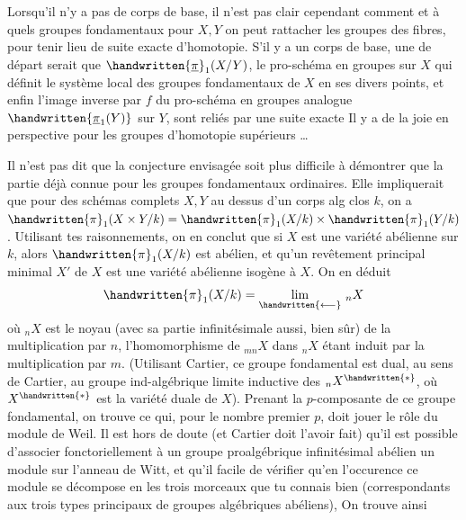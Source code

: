 
Lorsqu'il n'y a pas de corps de base, il n'est pas clair cependant
comment et à quels groupes fondamentaux  pour $X,Y$ on peut
rattacher  les groupes  des fibres,
pour tenir lieu de suite exacte d'homotopie. S'il y a un corps de
base, une   de départ serait que  $\handwritten{\underline\pi}_1(X/Y)$, le pro-schéma en groupes  sur $X$ qui définit le système
local des groupes fondamentaux  de $X$ en ses divers points,
et enfin l'image inverse par $f$ du pro-schéma en groupes analogue $\handwritten{\underline{\pi}_1(Y)}$
sur $Y$, sont reliés par une suite exacte   Il y a de
la joie en perspective pour les groupes d'homotopie supérieurs \ldots

Il n'est pas dit que la conjecture envisagée soit plus difficile
à démontrer que la partie déjà connue pour les groupes fondamentaux
ordinaires. Elle impliquerait que pour des schémas complets $X,Y$ au
dessus d'un corps alg clos $k$, on a $\handwritten{\pi}_1(X\times Y/k)=\handwritten{\pi}_1(X/k)\times\handwritten{\pi}_1(Y/k)$.
Utilisant tes raisonnements, on en conclut que si $X$ est une
variété abélienne sur $k$, alors $\handwritten{\pi}_1(X/k)$ est abélien, et qu'un
revêtement principal minimal $X'$ de $X$ est une variété abélienne isogène à $X$. On en déduit
\[
\handwritten{\pi}_1(X/k)=\underset{\handwritten{\longleftarrow}}{\lim}\ {}_nX
\]
où ${}_nX$ est le noyau (avec sa partie infinitésimale aussi, bien sûr)
de la multiplication par $n$, l'homomorphisme de ${}_{mn}X$ dans ${}_nX$ étant
induit par la multiplication par $m$. (Utilisant Cartier, ce groupe
fondamental est dual, au sens de Cartier, au groupe ind-algébrique
limite inductive des ${}_nX^{\handwritten{*}}$, où $X^{\handwritten{*}}$ est la variété duale de $X$).
Prenant la $p$-composante de ce groupe fondamental, on trouve ce qui,
pour le nombre premier $p$, doit jouer le rôle du module de Weil. Il
est hors de doute (et Cartier doit l'avoir fait) qu'il est possible
d'associer  fonctoriellement à un groupe proalgébrique infinitésimal abélien un module sur l'anneau de Witt, et  qu'il 
facile de vérifier qu'en l'occurence ce module se décompose en les
trois morceaux que tu connais bien (correspondants aux trois types
principaux de groupes algébriques abéliens),  On trouve ainsi
